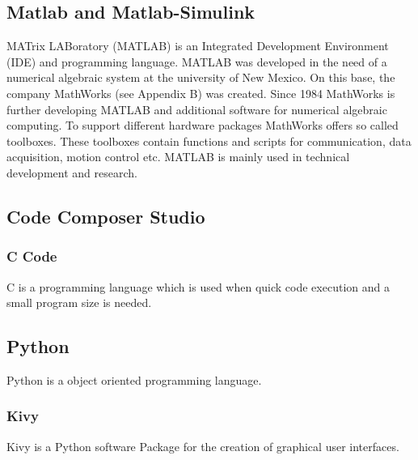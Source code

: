 \subsection{Matlab and Matlab-Simulink}
MATrix LABoratory (MATLAB) is an Integrated Development Environment (IDE)
and programming language. MATLAB was developed in the need of a numerical algebraic
system at the university of New Mexico. On this base, the company MathWorks (see
Appendix B) was created. Since 1984 MathWorks is further developing MATLAB and
additional software for numerical algebraic computing. To support different hardware
packages MathWorks offers so called toolboxes. These toolboxes contain functions and
scripts for communication, data acquisition, motion control etc.
MATLAB is mainly used in technical development and research.

\subsection{Code Composer Studio}
\subsubsection{C Code}
C is a programming language which is used when quick code execution and a small program size is needed.

\subsection{Python}
Python is a object oriented programming language.
\subsubsection{Kivy}
Kivy is a Python software Package for the creation of graphical user interfaces.

